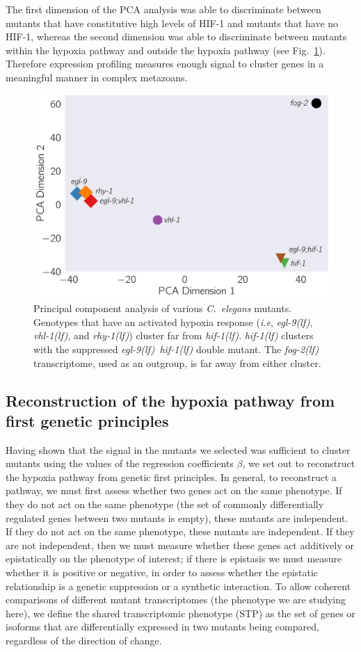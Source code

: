 \documentclass[10pt, onecolumn]{article}
\newcommand{\cel}{\emph{C.~elegans}}
\newcommand{\fog}{\emph{\mbox{fog-2(lf)}}}
\newcommand{\egl}{\emph{\mbox{egl-9}(lf)}}
\newcommand{\rhy}{\emph{\mbox{rhy-1}(lf)}}
\newcommand{\vhl}{\emph{\mbox{vhl-1}(lf)}}
\newcommand{\eglhif}{\emph{\mbox{egl-9(lf)}~\mbox{hif-1(lf)}}}
\newcommand{\hif}{\emph{\mbox{hif-1(lf)}}}
\newcommand{\hifp}{HIF-1}
\begin{document}
The first dimension of the PCA analysis was able to discriminate between mutants
that have constitutive high levels of \hifp{} and mutants that have no \hifp{},
whereas the second dimension was able to discriminate between mutants within the
hypoxia pathway and outside the hypoxia pathway (see Fig.~\ref{fig:pca}).
Therefore expression profiling measures enough signal to cluster genes in a
meaningful manner in complex metazoans.

\begin{figure}[tbhp]
\centering
\includegraphics[width=0.5\linewidth]{../figs/pca.pdf}
\caption{
Principal component analysis of various \cel{} mutants. Genotypes that have an
activated hypoxia response (\emph{i.e}, \egl{}, \vhl{}, and \rhy{}) cluster far
from \hif{}. \hif{} clusters with the suppressed \eglhif{} double mutant.
The \fog{} transcriptome, used as an outgroup, is far away from either cluster.
}
\label{fig:pca}
\end{figure}

\subsection*{Reconstruction of the hypoxia pathway from first genetic principles}
\label{sec:reconstruct}
Having shown that the signal in the mutants we selected was sufficient to
cluster mutants using the values of the regression coefficients $\beta$, we set
out to reconstruct the hypoxia pathway from genetic first principles. In general,
to reconstruct a pathway, we must first assess whether two genes act on the same
phenotype. If they do not act on the same phenotype (the set of commonly differentially
regulated genes between two mutants is empty), these mutants are independent.
If they do not act on the same phenotype, these mutants are independent. If they
are not independent, then we must measure whether these genes act additively or
epistatically on the phenotype of interest; if there is epistasis we must measure
whether it is positive or negative, in order to assess whether the epistatic
relationship is a genetic suppression or a synthetic interaction.
To allow coherent comparisons of different mutant transcriptomes (the phenotype
we are studying here), we define the
shared transcriptomic phenotype (STP) as the set of genes or isoforms that are
differentially expressed in two mutants being compared, regardless of the direction
of change.
\end{document}
